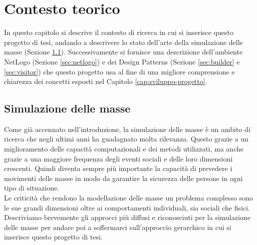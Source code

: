 \chapter{Contesto teorico}
In questo capitolo si descrive il contesto di ricerca in cui si inserisce questo progetto di tesi, andando a descrivere lo stato dell'arte della simulazione delle masse (Sezione \ref{sec:simulazione-masse}). Successivamente si fornisce una descrizione dell'ambiente NetLogo (Sezione \ref{sec:netlogo}) e dei Design Patterns (Sezione \ref{sec:builder} e \ref{sec:visitor}) che questo progetto usa al fine di una migliore comprensione e chiarezza dei concetti esposti nel Capitolo \ref{cap:sviluppo-progetto}.
\section{Simulazione delle masse}
\label{sec:simulazione-masse}
Come già accennato nell'introduzione, la simulazione delle masse è un ambito di ricerca che negli ultimi anni ha guadagnato molta rilevanza. Questo grazie a un miglioramento delle capacità computazionali e dei metodi utilizzati, ma anche grazie a una maggiore frequenza degli eventi sociali e delle loro dimensioni crescenti. Quindi diventa sempre più importante la capacità di prevedere i movimenti delle masse in modo da garantire la sicurezza delle persone in ogni tipo di situazione.\\
Le criticità che rendono la modellazione delle masse un problema complesso sono le sue grandi dimensioni oltre ai comportamenti individuali, sia sociali che fisici.\\
Descriviamo brevemente gli approcci più diffusi e riconosciuti per la simulazione delle masse per andare poi a soffermarci sull'approccio gerarchico in cui si inserisce questo progetto di tesi.
